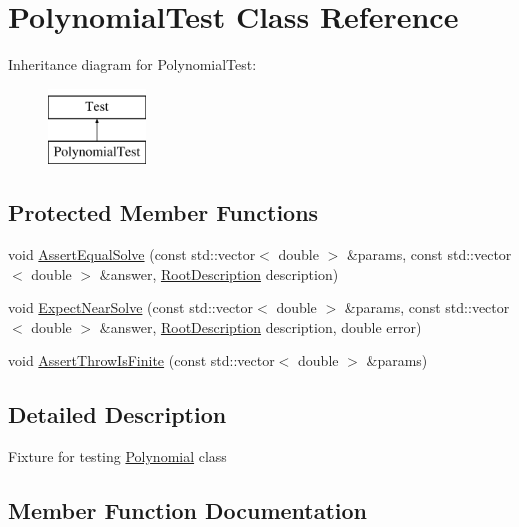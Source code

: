\hypertarget{class_polynomial_test}{}\section{Polynomial\+Test Class Reference}
\label{class_polynomial_test}
Inheritance diagram for Polynomial\+Test\+:\begin{figure}[H]
\begin{center}
\leavevmode
\includegraphics[height=2.000000cm]{class_polynomial_test}
\end{center}
\end{figure}
\subsection*{Protected Member Functions}
\begin{DoxyCompactItemize}
\item 
void \mbox{\hyperlink{class_polynomial_test_a4c48313f8592ad80809b7cb7e94fb4e8}{Assert\+Equal\+Solve}} (const std\+::vector$<$ double $>$ \&params, const std\+::vector$<$ double $>$ \&answer, \mbox{\hyperlink{_polynomial_8h_a4d41a8f81d16e61db1ddcce54a5f2586}{Root\+Description}} description)
\item 
void \mbox{\hyperlink{class_polynomial_test_a3c7d6879c0b7514e67db26f1cdf053cc}{Expect\+Near\+Solve}} (const std\+::vector$<$ double $>$ \&params, const std\+::vector$<$ double $>$ \&answer, \mbox{\hyperlink{_polynomial_8h_a4d41a8f81d16e61db1ddcce54a5f2586}{Root\+Description}} description, double error)
\item 
void \mbox{\hyperlink{class_polynomial_test_a8c21881fa8afd2134e49ffad8c3c1214}{Assert\+Throw\+Is\+Finite}} (const std\+::vector$<$ double $>$ \&params)
\end{DoxyCompactItemize}


\subsection{Detailed Description}
Fixture for testing \mbox{\hyperlink{class_polynomial}{Polynomial}} class 

\subsection{Member Function Documentation}
\mbox{\label{class_polynomial_test_a4c48313f8592ad80809b7cb7e94fb4e8}} 
